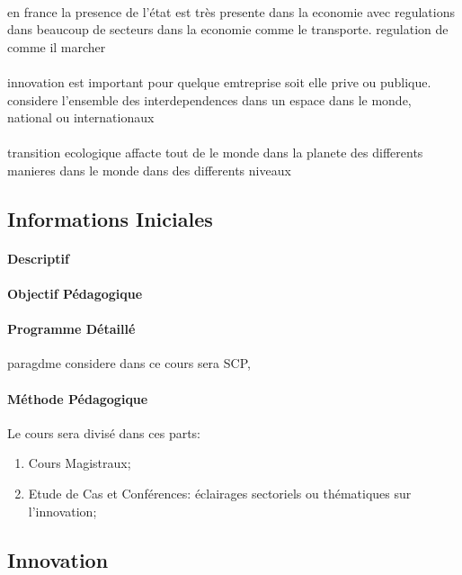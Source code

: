 \documentclass{article}
\begin{document}
\paragraph{}en france la presence de l'état est très presente dans la economie avec regulations dans beaucoup de secteurs dans la economie comme le transporte. regulation de comme il marcher


\paragraph{}innovation est important pour quelque emtreprise soit elle prive ou publique. considere l'ensemble des interdependences dans un espace dans le monde, national ou internationaux 


\paragraph{}transition ecologique affacte tout de le monde dans la planete des differents manieres dans le monde dans des differents niveaux

\subsection{Informations Iniciales}
\paragraph{Descriptif}
\paragraph{Objectif Pédagogique}
\paragraph{Programme Détaillé}paragdme considere dans ce cours sera SCP, %
\paragraph{Méthode Pédagogique}Le cours sera divisé dans ces parts:
\begin{enumerate}
    \item Cours Magistraux;
    \item Etude de Cas et Conférences: éclairages sectoriels ou thématiques sur l'innovation;
\end{enumerate}

\subsection{Innovation}
\end{document}
